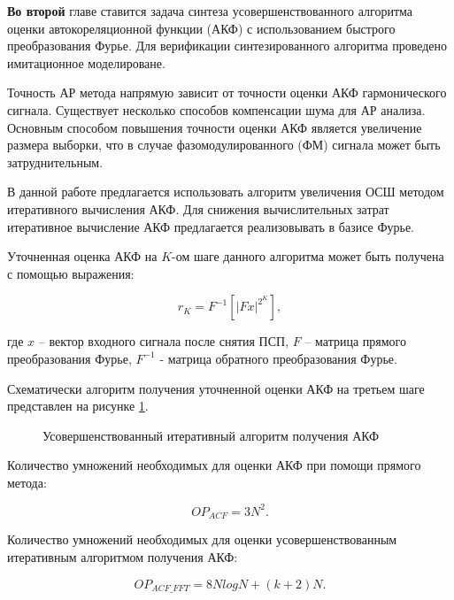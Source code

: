 {\bf{Во второй}} главе ставится задача синтеза усовершенствованного алгоритма оценки автокореляционной функции (АКФ) с использованием
быстрого преобразования Фурье. Для верификации синтезированного алгоритма проведено имитационное моделироване.

Точность АР метода напрямую зависит от точности оценки АКФ гармонического сигнала.
Существует несколько способов компенсации шума для АР анализа.
Основным способом повышения точности оценки АКФ является увеличение размера выборки, что в случае фазомодулированного (ФМ) сигнала может быть затруднительным. 

В данной работе предлагается использовать алгоритм увеличения ОСШ методом итеративного вычисления АКФ.
Для снижения вычислительных затрат итеративное вычисление АКФ предлагается реализовывать в базисе Фурье. 

Уточненная оценка АКФ на ${K}$-ом шаге данного алгоритма может быть получена с помощью выражения:
\begin{center}
\begin{equation}
	\label{eq:akf_3}
	\hat{r}_K = F^{-1}\left[ \left| Fx \right| ^{2^K} \right],
\end{equation}
\end{center}
где ${x}$ – вектор входного сигнала после снятия ПСП, ${F}$ – матрица прямого преобразования Фурье,
${F^{-1}}$ - матрица обратного преобразования Фурье.

Схематически алгоритм получения уточненной оценки АКФ на третьем шаге представлен на рисунке \ref{pic:akf_pic}.
\begin{figure}[h]
	\center{}
	\caption{Усовершенствованный итеративный алгоритм получения АКФ}
	\label{pic:akf_pic}
\end{figure}

Количество умножений необходимых для оценки АКФ при помощи прямого метода:
\begin{center}
\begin{equation}
	OP_{ACF} = 3N^2.
\end{equation}
\end{center}

Количество умножений необходимых для оценки усовершенствованным итеративным алгоритмом получения АКФ: \begin{center}
\begin{equation}
	OP_{ACF\_FFT} = 8NlogN + (k+2)N.
\end{equation}
\end{center}

